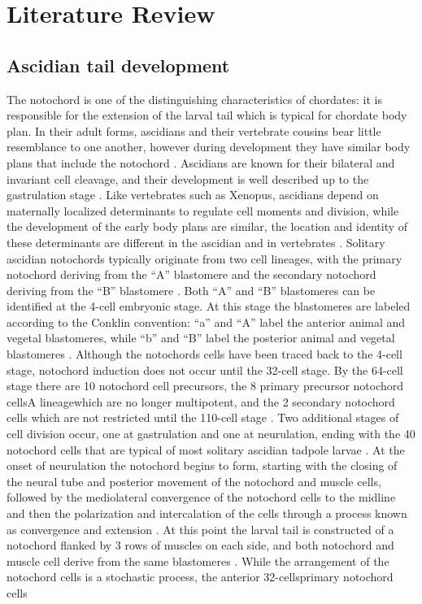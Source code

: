 \chapter{Literature Review}
\section{Ascidian tail development}

The notochord is one of the distinguishing characteristics of chordates: it is responsible for the extension of the larval tail which is typical for chordate body plan. In their adult forms, ascidians and their vertebrate cousins bear little resemblance to one another, however during development they have similar body plans that include the notochord \cite{jeffery_minireview_2002}. Ascidians are known for their bilateral and invariant cell cleavage, and their development is well described up to the gastrulation stage \cite{nishida_cell_1983,nishida_cell_1985,nishida_cell_1987}. Like vertebrates such as Xenopus, ascidians depend on maternally localized determinants to regulate cell moments and division, while the development of the early body plans are similar, the location and identity of these determinants are different in the ascidian and in vertebrates \cite{lemaire_ascidians_2008}. Solitary ascidian notochords typically originate from two cell lineages, with the primary notochord deriving from the ``A'' blastomere and the secondary notochord deriving from the ``B'' blastomere \cite{nishida_cell_1983}.  Both ``A'' and ``B'' blastomeres can be identified at the 4-cell embryonic stage. At this stage the blastomeres are labeled according to the Conklin convention: ``a'' and ``A'' label the anterior animal and vegetal blastomeres, while ``b'' and ``B'' label the posterior animal and vegetal blastomeres \cite{conklin_organization_1905} . Although the notochords cells have been traced back to the 4-cell stage, notochord induction does not occur until the 32-cell stage. By the 64-cell stage there are 10 notochord cell precursors, the 8 primary precursor notochord cells\textemdash A lineage\textemdash which are no longer multipotent, and the 2 secondary notochord cells which are not restricted until the 110-cell stage \cite{nishida_cell_1985,yasuo_ascidian_1994,yasuo_conservation_1998,lemaire_unfolding_2009}. Two additional stages of cell division occur, one at gastrulation and one at neurulation, ending with the 40 notochord cells that are typical of most solitary ascidian tadpole larvae \cite{conklin_organization_1905}. At the onset of neurulation the notochord begins to form, starting with the closing of the neural tube and posterior movement of the notochord and muscle cells, followed by the mediolateral convergence of the notochord cells to the midline and then the polarization and intercalation of the cells through a process known as convergence and extension \cite{swalla_mechanisms_1993}. At this point the larval tail is constructed of a notochord flanked by 3 rows of muscles on each side, and both notochord and muscle cell derive from the same blastomeres \cite{nishida_cell_1985}. While the arrangement of the notochord cells is a stochastic process, the anterior 32-cells\textemdash primary notochord cells\textemdash 